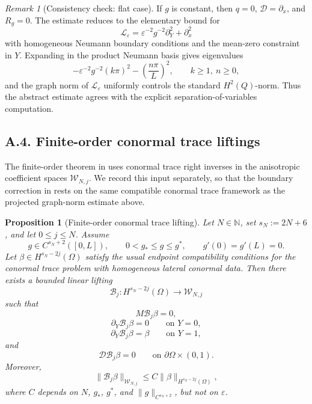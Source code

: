 \documentclass[11pt]{article}
\newtheorem{proposition}[theorem]{Proposition}
\theoremstyle{definition}
\theoremstyle{remark}
\newtheorem{remark}[theorem]{Remark}
\numberwithin{equation}{section}
\begin{document}
\begin{remark}[Consistency check: flat case]
If \(g\) is constant, then \(q=0\), \(\mathcal D=\partial_x\), and
\(R_g=0\). The estimate reduces to the elementary bound for
\[
\mathscr L_\varepsilon
=
\varepsilon^{-2}g^{-2}\partial_Y^2+\partial_x^2
\]
with homogeneous Neumann boundary conditions and the mean-zero constraint in
\(Y\). Expanding in the product Neumann basis gives eigenvalues
\[
-\varepsilon^{-2}g^{-2}(k\pi)^2-\left(\frac{n\pi}{L}\right)^2,
\qquad k\ge1,\ n\ge0,
\]
and the graph norm of \(\mathscr L_\varepsilon\) uniformly controls the
standard \(H^2(Q)\)-norm. Thus the abstract estimate agrees with the explicit
separation-of-variables computation.
\end{remark}


\subsection*{A.4. Finite-order conormal trace liftings}
\label{app:finite-order-conormal-liftings}

The finite-order theorem in 
uses conormal trace right inverses in the anisotropic coefficient spaces
\(\mathcal W_{N,j}\). We record this input separately, so that the boundary
correction in  rests on the same
compatible conormal trace framework as the projected graph-norm estimate above.

\begin{proposition}[Finite-order conormal trace lifting]
\label{prop:finite-order-conormal-trace-lifting}
Let \(N\in\mathbb N\), set \(s_N:=2N+6\), and let \(0\le j\le N\). Assume
\[
g\in C^{s_N+2}([0,L]),
\qquad
0<g_*\le g\le g^*,
\qquad
 g'(0)=g'(L)=0.
\]
Let \(\beta\in H^{s_N-2j}(\Omega)\) satisfy the usual endpoint compatibility
conditions for the conormal trace problem with homogeneous lateral conormal
data. Then there exists a bounded linear lifting
\[
\mathscr B_j:H^{s_N-2j}(\Omega)\to \mathcal W_{N,j}
\]
such that
\[
M\mathscr B_j\beta=0,
\]
\[
\partial_Y\mathscr B_j\beta=0
\qquad\text{on }Y=0,
\]
\[
\partial_Y\mathscr B_j\beta=\beta
\qquad\text{on }Y=1,
\]
and
\[
\mathcal D\mathscr B_j\beta=0
\qquad\text{on }\partial\Omega\times(0,1).
\]
Moreover,
\[
\|\mathscr B_j\beta\|_{\mathcal W_{N,j}}
\le
C\|\beta\|_{H^{s_N-2j}(\Omega)},
\]
where \(C\) depends on \(N\), \(g_*\), \(g^*\), and
\(\|g\|_{C^{s_N+2}}\), but not on \(\varepsilon\).
\end{proposition}
\end{document}
